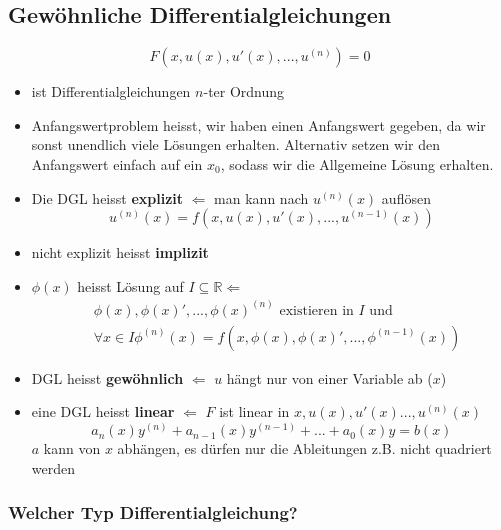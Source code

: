 \documentclass[a4paper]{article}
\newcommand{\R}{\mathbb{R}}
\begin{document}
\subsection{Gewöhnliche Differentialgleichungen}
\[
	F(x, u(x), u'(x), ..., u ^{(n)}) = 0
\] 
\begin{itemize}
	\item ist Differentialgleichungen $n$-ter Ordnung
	\item Anfangswertproblem heisst, wir haben einen Anfangswert gegeben,
		da wir sonst unendlich viele Lösungen erhalten. Alternativ
		setzen wir den Anfangswert einfach auf ein $x_0$, sodass wir
		die Allgemeine Lösung erhalten.
	\item Die DGL heisst \textbf{explizit}
		$\Leftarrow$ man kann nach $u ^{(n)} (x)$ auflösen
		\[
			u ^{(n)} (x) =
			f(
				x,
				u(x),
				u'(x),
				...,
				u ^{(n-1)} (x)
			)
		\] 
	\item nicht explizit heisst \textbf{implizit} 
	\item $\phi (x)$ heisst Lösung auf $I \subseteq \R \Leftarrow$
		\begin{align*}
			& \phi(x),
			\phi(x)',
			...,
			\phi(x) ^{(n)}
			\text{ existieren in } I \text{ und } \\
			&
			\forall x \in I
			\phi ^{(n)} (x) =
			f(
				x,
				\phi(x),
				\phi(x)',
				...,
				\phi ^{(n-1)} (x)
			)
		\end{align*}
	\item DGL heisst \textbf{gewöhnlich} $\Leftarrow$
		$u$ hängt nur von einer Variable ab ($x$)
	\item eine DGL heisst \textbf{linear} $\Leftarrow$
		$F$ ist linear in $x, u(x), u'(x) ..., u ^{(n)} (x)$
		\[
			a_n (x) y ^{(n)} +
			a_{n-1} (x) y ^{(n-1)} +
			... + 
			a_{0} (x) y
			= b(x)
		\] 
		$a$ kann von $x$ abhängen, es dürfen nur die Ableitungen
		z.B. nicht quadriert werden
\end{itemize}

\subsubsection{Welcher Typ Differentialgleichung?}
\end{document}
